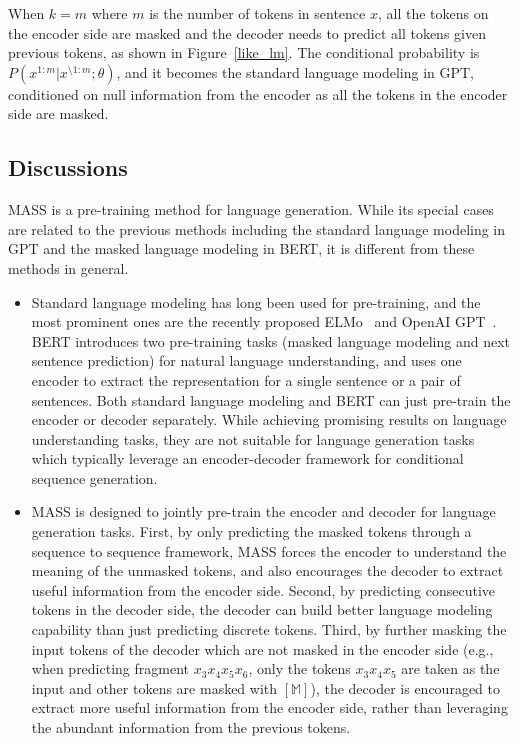 \documentclass{article}
\begin{document}
	When $k=m$ where $m$ is the number of tokens in sentence $x$, all the tokens on the encoder side are masked and the decoder needs to predict all tokens given previous tokens, as shown in Figure~\ref{like_lm}. The conditional probability is $P(x^{1:m}|x^{\setminus 1:m };\theta)$, and it becomes the standard language modeling in GPT, conditioned on null information from the encoder as all the tokens in the encoder side are masked. 
	
	\subsection{Discussions}
	\label{sec_mass_compare}
	MASS is a pre-training method for language generation. While its special cases are related to the previous methods including the standard language modeling in GPT and the masked language modeling in BERT, it is different from these methods in general.
	
\begin{itemize}
		\item Standard language modeling has long been used for pre-training, and the most prominent ones are the recently proposed ELMo~\citep{peters2018deep} and OpenAI GPT~\citep{radford2018improving}. BERT introduces two pre-training tasks (masked language modeling and next sentence prediction) for natural language understanding, and uses one encoder to extract the representation for a single sentence or a pair of sentences. Both standard language modeling and BERT can just pre-train the encoder or decoder separately. While achieving promising results on language understanding tasks, they are not suitable for language generation tasks which typically leverage an encoder-decoder framework for conditional sequence generation.
		
		\item MASS is designed to jointly pre-train the encoder and decoder for language generation tasks. First, by only predicting the masked tokens through a sequence to sequence framework, MASS forces the encoder to understand the meaning of the unmasked tokens, and also encourages the decoder to extract useful information from the encoder side. Second, by predicting consecutive tokens in the decoder side, the decoder can build better language modeling capability than just predicting discrete tokens. Third, by further masking the input tokens of the decoder which are not masked in the encoder side (e.g., when predicting fragment $x_3 x_4 x_5 x_6$, only the tokens $x_3 x_4 x_5$ are taken as the input and other tokens are masked with $[\mathbb{M}]$), the decoder is encouraged to extract more useful information from the encoder side, rather than leveraging the abundant information from the previous tokens. 
	\end{itemize}
\end{document}
